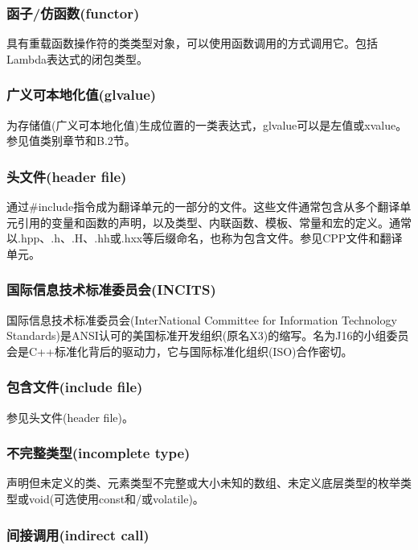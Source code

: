 \subsubsection{函子/仿函数(functor)}

具有重载函数操作符的类类型对象，可以使用函数调用的方式调用它。包括Lambda表达式的闭包类型。

\subsubsection{广义可本地化值(glvalue)}

为存储值(广义可本地化值)生成位置的一类表达式，glvalue可以是左值或xvalue。参见值类别章节和B.2节。

\subsubsection{头文件(header file)}

通过\#include指令成为翻译单元的一部分的文件。这些文件通常包含从多个翻译单元引用的变量和函数的声明，以及类型、内联函数、模板、常量和宏的定义。通常以.hpp、.h、.H、.hh或.hxx等后缀命名，也称为包含文件。参见CPP文件和翻译单元。

\subsubsection{国际信息技术标准委员会(INCITS)}

国际信息技术标准委员会(InterNational Committee for Information Technology Standards)是ANSI认可的美国标准开发组织(原名X3)的缩写。名为J16的小组委员会是C++标准化背后的驱动力，它与国际标准化组织(ISO)合作密切。

\subsubsection{包含文件(include file)}

参见头文件(header file)。

\subsubsection{不完整类型(incomplete type)}

声明但未定义的类、元素类型不完整或大小未知的数组、未定义底层类型的枚举类型或void(可选使用const和/或volatile)。

\subsubsection{间接调用(indirect call)}

